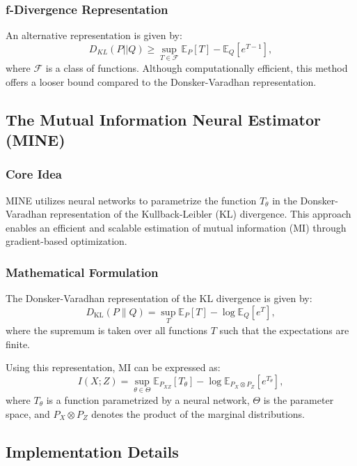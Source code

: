 \documentclass[lettersize,journal]{IEEEtran}
\begin{document}
\subsubsection{f-Divergence Representation}
An alternative representation is given by:
\begin{equation}
    D_{KL}(P || Q) \geq \sup_{T \in \mathcal{F}} \mathbb{E}_P[T] - \mathbb{E}_Q[e^{T-1}],
\end{equation}
where $\mathcal{F}$ is a class of functions. Although computationally efficient, this method offers a looser bound compared to the Donsker-Varadhan representation.


\subsection{The Mutual Information Neural Estimator (MINE)}
\subsubsection{Core Idea}
MINE utilizes neural networks to parametrize the function \( T_\theta \) in the Donsker-Varadhan representation of the Kullback-Leibler (KL) divergence. This approach enables an efficient and scalable estimation of mutual information (MI) through gradient-based optimization.

\subsubsection{Mathematical Formulation}
The Donsker-Varadhan representation of the KL divergence is given by:
\begin{equation}
D_{\text{KL}}(P \| Q) = \sup_{T} \mathbb{E}_P[T] - \log \mathbb{E}_Q\left[e^T\right],
\end{equation}
where the supremum is taken over all functions \( T \) such that the expectations are finite.

Using this representation, MI can be expressed as:
\begin{equation}
I(X; Z) = \sup_{\theta \in \Theta} \mathbb{E}_{P_{XZ}}[T_\theta] - \log \mathbb{E}_{P_X \otimes P_Z}\left[e^{T_\theta}\right],
\end{equation}
where \( T_\theta \) is a function parametrized by a neural network, \( \Theta \) is the parameter space, and \( P_X \otimes P_Z \) denotes the product of the marginal distributions.

\subsection{Implementation Details}
\end{document}
